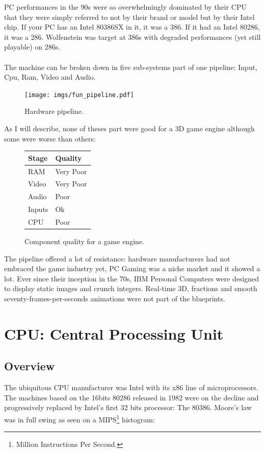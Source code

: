 \documentclass[book.tex]{subfiles}
\begin{document}
PC performances in the 90s were so overwhelmingly dominated by their CPU that they were simply referred to not by their brand or model but by their Intel chip. If your PC has an Intel 80386SX in it, it was a 386. If it had an Intel 80286, it was a 286. Wolfenstein was target at 386s with degraded performances (yet still playable) on 286s.\\
\\
The machine can be broken down in five sub-systems part of one pipeline: Input, Cpu, Ram, Video and Audio.\\
 \bigskip
\begin{figure}[H]
\centering
\texttt{[image: imgs/fun\_pipeline.pdf]}
%
\caption{Hardware pipeline.}
\label{fig:digraph}
\end{figure}

As I will describe, none of theses part were good for a 3D game engine although some were worse than others:

 \bigskip

\begin{figure}[H]
\centering
\begin{tabularx}{\textwidth}{ X X  }
  \toprule
  \textbf{Stage} & \textbf{Quality} \\ \bottomrule
  RAM & Very Poor \\ 
  Video & Very Poor \\ 
  Audio & Poor \\ 
  Inputs & Ok \\ 
  CPU & Poor \\ \bottomrule
\end{tabularx}
\caption{Component quality for a game engine.}
\end{figure}

The pipeline offered a lot of resistance: hardware manufacturers had not embraced the game industry yet, PC Gaming was a niche market and it showed a lot. Ever since their inception in the 70s, IBM Personal Computers were designed to display static images and crunch integers. Real-time 3D, fractions and smooth seventy-frames-per-seconds animations were not part of the blueprints.

\section{CPU: Central Processing Unit}
  \subsection{Overview}
  The ubiquitous CPU manufacturer was Intel with its x86 line of microprocessors.  The machines based on the 16bits 80286 released in 1982 were on the decline and progressively replaced by Intel's first 32 bits processor: The 80386. Moore's law was in full swing as seen on a MIPS\footnote{Million Instructions Per Second.} histogram:
\end{document}
